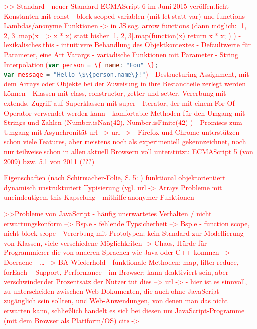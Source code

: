 \documentclass[a4paper, 12pt, hidelinks, listof=totoc, listoftables=totoc, bibliography=totoc]{scrreprt}
\newcommand{\js}[1]{\lstinline[language=JavaScript, style=inline]|#1|}
\newcommand{\TODO}[1]{\textcolor{red}{#1}\newline}
\begin{document}
\TODO{>> Standard}
\TODO{- neuer Standard ECMAScript 6 im Juni 2015 veröffentlicht}
\TODO{	- Konstanten mit const}
\TODO{	- block-scoped variablen (mit let statt var) und functions}
\TODO{	- Lambdas/anonyme Funktionen -> in JS sog. arrow functions (dann möglich: [1, 2, 3].map(x => x * x) statt bisher [1, 2, 3].map(function(x) { return x * x; }) )}
\TODO{	- lexikalisches this - intuitivere Behandlung des Objektkontextes}
\TODO{	- Defaultwerte für Parameter, eine Art Varargs}
\TODO{	- variadische Funktionen mit Parameter}
\TODO{	- String Interpolation (\js{var person = \{ name: "Foo" \};} \\ \js{var message = "Hello \$\{person.name\}!"})}
\TODO{	- Destructuring Assignment, mit dem Arrays oder Objekte bei der Zuweisung in ihre Bestandteile zerlegt werden können}
\TODO{	- Klassen mit class, constructor, getter und setter, Vererbung mit extends, Zugriff auf Superklassen mit super}
\TODO{	- Iterator, der mit einem For-Of-Operator verwendet werden kann}
\TODO{	- komfortable Methoden für den Umgang mit Strings und Zahlen (Number.isNan(42), Number.isFinite(42) )}
\TODO{	- Promises zum Umgang mit Asynchronität}
\TODO{	url -->  %
}
\TODO{	url -->  %
}
\TODO{- Firefox und Chrome unterstützen schon viele Features, aber meistens noch als experimentell gekennzeichnet, noch nur teilweise schon in allen aktuell Browsern voll unterstützt: ECMAScript 5 (von 2009) bzw. 5.1 von 2011 (???)}



\TODO{Eigenschaften (nach Schirmacher-Folie, S. 5: %
)}
\TODO{	funktional}
\TODO{	objektorientiert}
\TODO{	dynamisch}
\TODO{	unstrukturiert}
\TODO{	Typisierung (vgl. url -> %
}
\TODO{	Arrays}
\TODO{	Probleme mit uneindeutigem this}
\TODO{	Kapselung - mithilfe anonymer Funktionen}
	
                             
\TODO{>>Probleme von JavaScript}
\TODO{- häufig unerwartetes Verhalten / nicht erwartungskonform  -->  Bsp.e}
\TODO{- fehlende Typsicherheit  -->  Bsp.e}
\TODO{- function scope, nicht block scope}
\TODO{- Vererbung mit Prototypen; kein Standard zur Modellierung von Klassen, viele verschiedene Möglichkeiten  ->  Chaos, Hürde für Programmierer die von anderen Sprachen wie Java oder C++ kommen}
\TODO{-->  Doeraene}
\TODO{- ...}
\TODO{-->  BA Wiederhold}
\TODO{- funktionale Methoden: map, filter reduce, forEach -- Support, Performance}
\TODO{- im Browser: kann deaktiviert sein, aber verschwindender Prozentsatz der Nutzer tut dies  --> url -> %
}
\TODO{	- hier ist es sinnvoll, zu unterscheiden zwischen Web-Dokumenten, die auch ohne JavaScript zugänglich sein sollten, und Web-Anwendungen, von denen man das nicht erwarten kann, schließlich handelt es sich bei diesen um JavaScript-Programme (mit dem Browser als Plattform/OS)}
\TODO{	cite -> %
}
\end{document}
